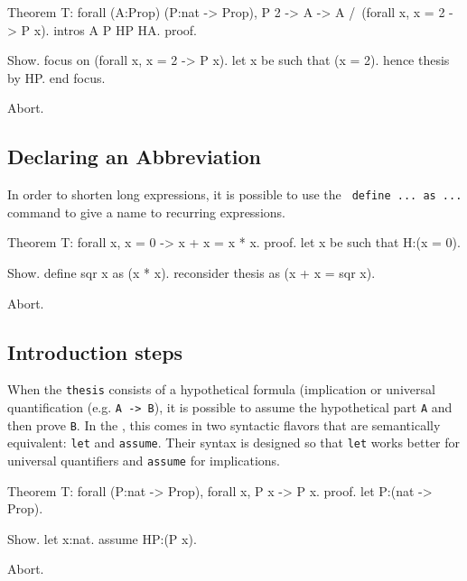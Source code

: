 \begin{coq_eval}
Theorem T: forall (A:Prop) (P:nat -> Prop), P 2 -> A -> A /\ (forall x, x = 2 -> P x).
intros A P HP HA.
proof.
\end{coq_eval} 
\begin{coq_example}
Show.
focus on (forall x, x = 2 -> P x).
let x be such that (x = 2).
hence thesis by HP.
end focus.
\end{coq_example}
\begin{coq_eval}
Abort.
\end{coq_eval}

\subsection{Declaring an Abbreviation}

In order to shorten long expressions, it is possible to use the {\tt
  define ... as ...} command to give a name to recurring expressions.

\begin{coq_eval}
Theorem T: forall x, x = 0 -> x + x = x * x.
proof.
let x be such that H:(x = 0).
\end{coq_eval} 
\begin{coq_example}
Show.
define sqr x as (x * x).
reconsider thesis as (x + x = sqr x).
\end{coq_example}
\begin{coq_eval}
Abort.
\end{coq_eval}

\subsection{Introduction steps}

When the {\tt thesis} consists of a hypothetical formula (implication
or universal quantification (e.g. \verb+A -> B+), it is possible to
assume the hypothetical part {\tt A} and then prove {\tt B}. In the
\DPL{}, this comes in two syntactic flavors that are semantically
equivalent: {\tt let} and {\tt assume}. Their syntax is designed so that
{\tt let} works better for universal quantifiers and {\tt assume} for
implications.

\begin{coq_eval}
Theorem T: forall (P:nat -> Prop), forall x, P x -> P x.
proof.
let P:(nat -> Prop).
\end{coq_eval} 
\begin{coq_example}
Show.
let x:nat.
assume HP:(P x).
\end{coq_example}
\begin{coq_eval}
Abort.
\end{coq_eval}


